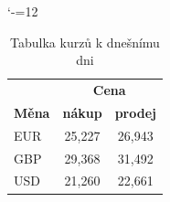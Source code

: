 \documentclass[a4paper, 11pt]{article}
\begin{document}
\begin{table}[h]
\catcode`-=12
\begin{center}
\begin{tabular}{|l|c|c|}
\hline
                & \multicolumn{2}{c|}{\textbf{Cena}} \\\cline{2-3}
\textbf{Měna}   & \textbf{nákup}  & \textbf{prodej}  \\ \hline
EUR             & 25,227          & 26,943           \\
GBP             & 29,368          & 31,492           \\
USD             & 21,260          & 22,661           \\ \hline
\end{tabular}
\caption{\label{tab:tab1}Tabulka kurzů k dnešnímu dni}
\end{center}
\end{table}
\end{document}
